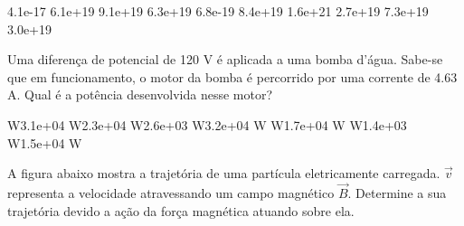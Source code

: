 \documentclass[12pt, addpoints]{exam}
\begin{document}
\begin{questions}
\begin{multicols*}{2}
\begin{oneparchoices}
\choice 4.1e-17 \choice 6.1e+19 \choice 9.1e+19 \choice 6.3e+19 \choice 6.8e-19 \choice 8.4e+19 \choice 1.6e+21 \choice 2.7e+19 \choice 7.3e+19 \choice 3.0e+19 
\end{oneparchoices}\question Uma diferença de potencial de 120 V é aplicada a uma bomba d’água. Sabe-se que em funcionamento, o motor da bomba é percorrido por uma corrente de    4.63 A. Qual é a potência desenvolvida nesse motor?

\begin{oneparchoices}
 W\choice 3.1e+04 W\choice 2.3e+04 W\choice 2.6e+03 W\choice 3.2e+04 W W\choice 1.7e+04 W W\choice 1.4e+03 W\choice 1.5e+04 W
\end{oneparchoices}\question A ﬁgura abaixo mostra a trajetória de uma partícula eletricamente carregada. $\vec{{v}}$ representa a velocidade atravessando um campo magnético $\vec{{B}}$. Determine a sua trajetória devido a ação da força magnética atuando sobre ela.
        
        \begin{center}
            \begin{minipage}[c]{0.5\linewidth}
            \end{minipage}
        \end{center}

        


\end{multicols*}
\end{questions}
\end{document}
